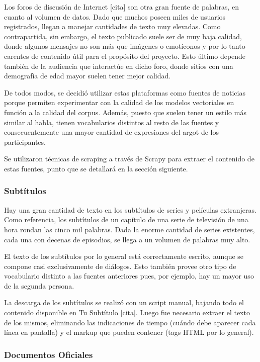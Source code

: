Los foros de discusión de Internet [cita] son otra gran fuente de palabras, en cuanto al volumen de
datos. Dado que muchos poseen miles de usuarios registrados, llegan a manejar cantidades de texto
muy elevadas. Como contrapartida, sin embargo, el texto publicado suele ser de muy baja calidad,
donde algunos mensajes no son más que imágenes o emotíconos y por lo tanto carentes de contenido
útil para el propósito del proyecto. Esto último depende también de la audiencia que interactúe en
dicho foro, donde sitios con una demografía de edad mayor suelen tener mejor calidad.

De todos modos, se decidió utilizar estas plataformas como fuentes de noticias porque permiten
experimentar con la calidad de los modelos vectoriales en función a la calidad del corpus. Además,
puesto que suelen tener un estilo más similar al habla, tienen vocabularios distintos al resto de
las fuentes y consecuentemente una mayor cantidad de expresiones del argot de los participantes.

Se utilizaron técnicas de scraping a través de Scrapy para extraer el contenido de estas fuentes,
punto que se detallará en la sección siguiente.


\subsubsection{Subtítulos}

Hay una gran cantidad de texto en los subtítulos de series y películas extranjeras. Como referencia,
los subtítulos de un capítulo de una serie de televisión de una hora rondan las cinco mil
palabras. Dada la enorme cantidad de series existentes, cada una con decenas de episodios, se llega
a un volumen de palabras muy alto.

El texto de los subtítulos por lo general está correctamente escrito, aunque se compone casi
exclusivamente de diálogos. Esto también provee otro tipo de vocabulario distinto a las fuentes
anteriores pues, por ejemplo, hay un mayor uso de la segunda persona.

La descarga de los subtítulos se realizó con un script manual, bajando todo el contenido disponible
en Tu Subtítulo [cita]. Luego fue necesario extraer el texto de los mismos, eliminando las
indicaciones de tiempo (cuándo debe aparecer cada línea en pantalla) y el markup que pueden contener
(tags HTML por lo general).


\subsubsection{Documentos Oficiales}

